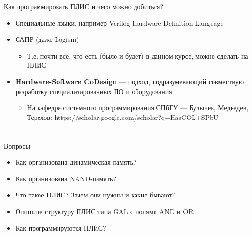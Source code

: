 \documentclass[xetex,aspectratio=43]{beamer}
\begin{document}
\begin{frame}{Как программировать ПЛИС и чего можно добиться?}
        \begin{itemize}
            \tightlist
            \item
            Специальные языки, например Verilog Hardware Definition Language
            \item
            САПР (даже Logism)

            \begin{itemize}
                \tightlist
                \item
                Т.е. почти всё, что есть (было и будет) в данном курсе, можно
                сделать на ПЛИС
            \end{itemize}
            \item
            \textbf{Hardware-Software CoDesign} --- подход, подразумевающий
            совместную разработку специализированных ПО и оборудования

            \begin{itemize}
                \tightlist
                \item
                На кафедре системного программирования СПбГУ --- Булычев, Медведев,
                Терехов: https://scholar.google.com/scholar?q=HasCOL+SPbU
            \end{itemize}
        \end{itemize}
\end{frame}

\section*{}

 \begin{frame}{Вопросы}
    \begin{itemize}
        \item
        Как организована динамическая память?
        \item
        Как организована NAND-память?
        \item
        Что такое ПЛИС? Зачем они нужны и какие бывают?
        \item
        Опишите структуру ПЛИС типа GAL с полями AND и OR
        \item
        Как программируются ПЛИС?
    \end{itemize}
\end{frame}

\postamble
\end{document}
